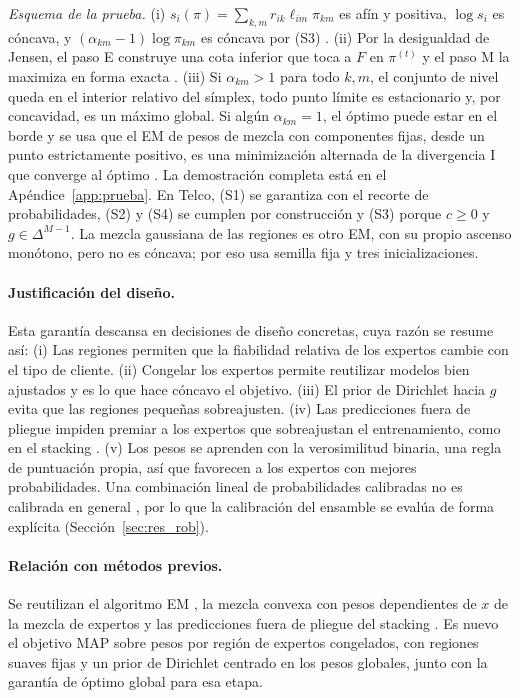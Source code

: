 \documentclass[11pt,a4paper]{article}
\begin{document}
\noindent\emph{Esquema de la prueba.} (i) $s_i(\pi)=\sum_{k,m}r_{ik}\ell_{im}\pi_{km}$ es afín y positiva, $\log s_i$ es cóncava, y $(\alpha_{km}-1)\log\pi_{km}$ es cóncava por (S3) \cite{boyd2004}. (ii) Por la desigualdad de Jensen, el paso E construye una cota inferior que toca a $F$ en $\pi^{(t)}$ y el paso M la maximiza en forma exacta \cite{dempster1977}. (iii) Si $\alpha_{km}>1$ para todo $k,m$, el conjunto de nivel queda en el interior relativo del símplex, todo punto límite es estacionario \cite{wu1983} y, por concavidad, es un máximo global. Si algún $\alpha_{km}=1$, el óptimo puede estar en el borde y se usa que el EM de pesos de mezcla con componentes fijas, desde un punto estrictamente positivo, es una minimización alternada de la divergencia I que converge al óptimo \cite{csiszar1984,vardi1985}. La demostración completa está en el Apéndice~\ref{app:prueba}. En Telco, (S1) se garantiza con el recorte de probabilidades, (S2) y (S4) se cumplen por construcción y (S3) porque $c\ge0$ y $g\in\Delta^{M-1}$. La mezcla gaussiana de las regiones es otro EM, con su propio ascenso monótono, pero no es cóncava; por eso usa semilla fija y tres inicializaciones.

\paragraph{Justificación del diseño.} Esta garantía descansa en decisiones de diseño concretas, cuya razón se resume así: (i) Las regiones permiten que la fiabilidad relativa de los expertos cambie con el tipo de cliente. (ii) Congelar los expertos permite reutilizar modelos bien ajustados y es lo que hace cóncavo el objetivo. (iii) El prior de Dirichlet hacia $g$ evita que las regiones pequeñas sobreajusten. (iv) Las predicciones fuera de pliegue impiden premiar a los expertos que sobreajustan el entrenamiento, como en el stacking \cite{wolpert1992}. (v) Los pesos se aprenden con la verosimilitud binaria, una regla de puntuación propia, así que favorecen a los expertos con mejores probabilidades. Una combinación lineal de probabilidades calibradas no es calibrada en general \cite{ranjan2010}, por lo que la calibración del ensamble se evalúa de forma explícita (Sección~\ref{sec:res_rob}).

\paragraph{Relación con métodos previos.} Se reutilizan el algoritmo EM \cite{dempster1977}, la mezcla convexa con pesos dependientes de $x$ de la mezcla de expertos \cite{jordan1994} y las predicciones fuera de pliegue del stacking \cite{wolpert1992}. Es nuevo el objetivo MAP sobre pesos por región de expertos congelados, con regiones suaves fijas y un prior de Dirichlet centrado en los pesos globales, junto con la garantía de óptimo global para esa etapa.
\end{document}

